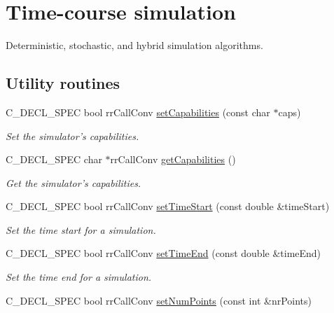\hypertarget{group__simulation}{
\section{\-Time-\/course simulation}
\label{group__simulation}
}


\-Deterministic, stochastic, and hybrid simulation algorithms.  


\subsection*{\-Utility routines}
\begin{DoxyCompactItemize}
\item 
\-C\-\_\-\-D\-E\-C\-L\-\_\-\-S\-P\-E\-C bool rr\-Call\-Conv \hyperlink{group__utility_ga320ffeeba3e5505371b52ce61715bf82}{set\-Capabilities} (const char $\ast$caps)
\begin{DoxyCompactList}\small\item\em \-Set the simulator's capabilities. \end{DoxyCompactList}\item 
\-C\-\_\-\-D\-E\-C\-L\-\_\-\-S\-P\-E\-C char $\ast$rr\-Call\-Conv \hyperlink{group__utility_gaecce7b3dda3548fbe579922aadf25610}{get\-Capabilities} ()
\begin{DoxyCompactList}\small\item\em \-Get the simulator's capabilities. \end{DoxyCompactList}\item 
\-C\-\_\-\-D\-E\-C\-L\-\_\-\-S\-P\-E\-C bool rr\-Call\-Conv \hyperlink{group__utility_ga1a636a76ad610d99fe1c780bb3d9296d}{set\-Time\-Start} (const double \&time\-Start)
\begin{DoxyCompactList}\small\item\em \-Set the time start for a simulation. \end{DoxyCompactList}\item 
\-C\-\_\-\-D\-E\-C\-L\-\_\-\-S\-P\-E\-C bool rr\-Call\-Conv \hyperlink{group__utility_ga1313e21d622cd846bdd75071e965eb6c}{set\-Time\-End} (const double \&time\-End)
\begin{DoxyCompactList}\small\item\em \-Set the time end for a simulation. \end{DoxyCompactList}\item 
\-C\-\_\-\-D\-E\-C\-L\-\_\-\-S\-P\-E\-C bool rr\-Call\-Conv \hyperlink{group__utility_ga448ead53bb8913de664cc8ad675b4197}{set\-Num\-Points} (const int \&nr\-Points)

\end{DoxyCompactItemize}
